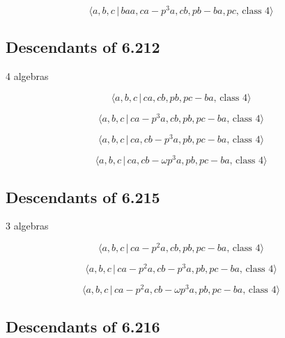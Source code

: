 \documentclass[10pt]{article}
\begin{document}
\begin{equation}
\langle a,b,c\,|\,baa,ca-p^3a,cb,pb-ba,pc,\,\text{class }4\rangle 
\tag{7.1914}
\end{equation}

\subsection{Descendants of 6.212}

4 algebras

\begin{equation}
\langle a,b,c\,|\,ca,cb,pb,pc-ba,\,\text{class }4\rangle  \tag{7.1915}
\end{equation}

\begin{equation}
\langle a,b,c\,|\,ca-p^3a,cb,pb,pc-ba,\,\text{class }4\rangle  \tag{7.1916}
\end{equation}

\begin{equation}
\langle a,b,c\,|\,ca,cb-p^3a,pb,pc-ba,\,\text{class }4\rangle  \tag{7.1917}
\end{equation}

\begin{equation}
\langle a,b,c\,|\,ca,cb-\omega p^{3}a,pb,pc-ba,\,\text{class }4\rangle 
\tag{7.1918}
\end{equation}

\subsection{Descendants of 6.215}

3 algebras

\begin{equation}
\langle a,b,c\,|\,ca-p^2a,cb,pb,pc-ba,\,\text{class }4\rangle  \tag{7.1919}
\end{equation}

\begin{equation}
\langle a,b,c\,|\,ca-p^2a,cb-p^3a,pb,pc-ba,\,\text{class }4\rangle 
\tag{7.1920}
\end{equation}

\begin{equation}
\langle a,b,c\,|\,ca-p^{2}a,cb-\omega p^{3}a,pb,pc-ba,\,\text{class }4\rangle
\tag{7.1921}
\end{equation}

\subsection{Descendants of 6.216}
\end{document}
